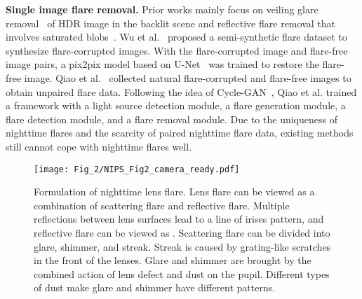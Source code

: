 \documentclass{article}
\newcommand{\yuekun}[1]{{\color{black}{#1}}}
\begin{document}
\noindent
\textbf{Single image flare removal.}  
Prior works mainly focus on veiling glare removal~\cite{HDR_1,HDR_2} of HDR image in the backlit scene and reflective flare removal that involves saturated blobs~\cite{automated_removal,auto_removal,auto_removal2}. 
\yuekun{Due to the lack of paired data that contains scattering flares and diverse reflective flares, deep learning-based methods are restricted.}
Wu et al.~\cite{how_to} proposed a semi-synthetic flare dataset to synthesize flare-corrupted images. 
With the flare-corrupted image and flare-free image pairs, a pix2pix model based on U-Net~\cite{unet} was trained to restore the flare-free image. 
Qiao et al.~\cite{light_source} collected natural flare-corrupted and flare-free images to obtain unpaired flare data. 
Following the idea of Cycle-GAN~\cite{CycleGAN}, Qiao et al. trained a framework with a light source detection module, a flare generation module, a flare detection module, and a flare removal module. 
Due to the uniqueness of nighttime flares and the scarcity of paired nighttime flare data, existing methods still cannot cope with nighttime flares well.

\begin{figure}[!t]
\centering
\vspace{-10pt}
\texttt{[image: Fig\_2/NIPS\_Fig2\_camera\_ready.pdf]}
\vspace{-2mm}
\caption{Formulation of nighttime lens flare. Lens flare can be viewed as a combination of scattering flare and reflective flare. Multiple reflections between lens surfaces lead to a line of irises pattern, and reflective flare can be viewed as \yuekun{the addition of these irises}.
Scattering flare can be divided into glare, shimmer, and streak. Streak is caused by grating-like scratches in the front of the lenses. Glare and shimmer are brought by the combined action of lens defect and dust on the pupil. Different types of dust make glare and shimmer have different patterns.}
\label{fig:flare_formation} 
\vspace{-12pt}
\end{figure}
\end{document}
